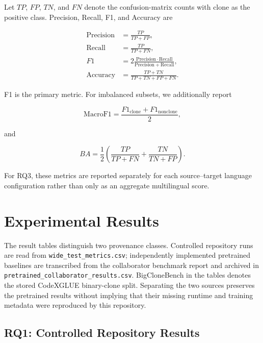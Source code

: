\documentclass[authoryear,final,5p,times,twocolumn]{elsarticle}
\theoremstyle{plain}
\begin{document}
Let $TP$, $FP$, $TN$, and $FN$ denote the confusion-matrix counts with clone
as the positive class. Precision, Recall, F1, and Accuracy are

\begin{align}
\label{eq:precision_metric}
\mathrm{Precision}
&=
\frac{TP}{TP+FP},
\\
\label{eq:recall_metric}
\mathrm{Recall}
&=
\frac{TP}{TP+FN},
\\
\label{eq:f1_metric}
F1
&=
2
\frac{
    \mathrm{Precision}\cdot\mathrm{Recall}
}{
    \mathrm{Precision}+\mathrm{Recall}
},
\\
\label{eq:accuracy_metric}
\mathrm{Accuracy}
&=
\frac{
    TP+TN
}{
    TP+TN+FP+FN
}.
\end{align}

F1 is the primary metric. For imbalanced subsets, we additionally report

\begin{equation}
\label{eq:macro_f1_metric}
\mathrm{MacroF1}
=
\frac{
    F1_{\mathrm{clone}}
    +
    F1_{\mathrm{nonclone}}
}{2},
\end{equation}

and

\begin{equation}
\label{eq:balanced_accuracy_metric}
BA
=
\frac{1}{2}
\left(
    \frac{TP}{TP+FN}
    +
    \frac{TN}{TN+FP}
\right).
\end{equation}

For RQ3, these metrics are reported separately for each source--target
language configuration rather than only as an aggregate multilingual score.

\section{Experimental Results}
\label{sec:exp_results}

The result tables distinguish two provenance classes. Controlled repository
runs are read from \texttt{wide\_test\_metrics.csv}; independently implemented
pretrained baselines are transcribed from the collaborator benchmark report and
archived in \texttt{pretrained\_collaborator\_results.csv}. BigCloneBench in
the tables denotes the stored CodeXGLUE binary-clone split. Separating the two
sources preserves the pretrained results without implying that their missing
runtime and training metadata were reproduced by this repository.

\subsection{RQ1: Controlled Repository Results}
\label{sec:rq}
\end{document}
